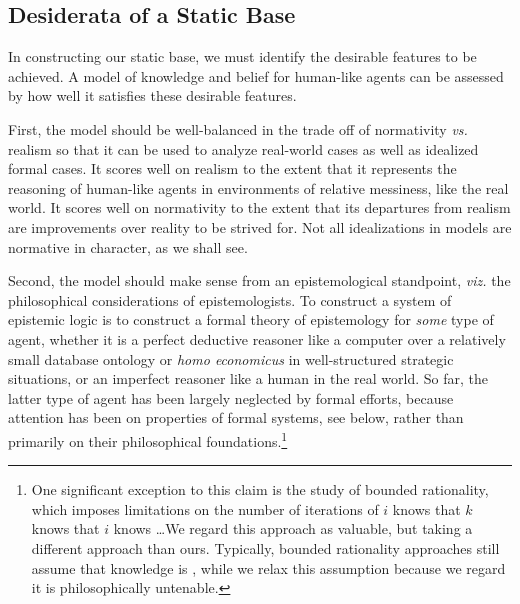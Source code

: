 

\subsection{Desiderata of a Static Base}
In constructing our static base, we must identify the desirable features to be achieved. A model of knowledge and belief for human-like agents can be assessed by how well it satisfies these desirable features. 

First, the model should be well-balanced in the trade off of normativity \emph{vs.} realism so that it can be used to analyze real-world cases as well as idealized formal cases. It scores well on realism to the extent that it represents the reasoning of human-like agents in environments of relative messiness, like the real world. It scores well on normativity to the extent that its departures from realism are improvements over reality to be strived for. Not all idealizations in models are normative in character, as we shall see.

Second, the model should make sense from an epistemological standpoint, \emph{viz.} the philosophical considerations of epistemologists. To construct a system of epistemic logic is to construct a formal theory of epistemology for \emph{some} type of agent, whether it is a perfect deductive reasoner like a computer over a relatively small database ontology or \emph{homo economicus} in well-structured strategic situations, or an imperfect reasoner like a human in the real world. So far, the latter type of agent has been largely neglected by formal efforts, because attention has been on properties of formal systems, see below, rather than primarily on their philosophical foundations.\footnote{One significant exception to this claim is the study of bounded rationality, which imposes limitations on the number of iterations of $i$ knows that $k$ knows that $i$ knows \dots We regard this approach as valuable, but taking a different approach than ours. Typically, bounded rationality approaches still assume that knowledge is \SFive, while we relax this assumption because we regard it is philosophically untenable.}

